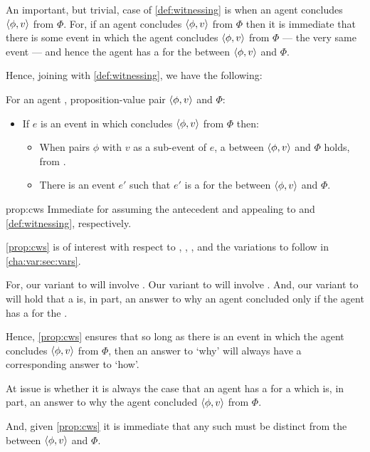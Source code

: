 \begin{note}
  An important, but trivial, case of \autoref{def:witnessing} is when an agent concludes \(\langle \phi, v \rangle\) from \(\Phi\).
  For, if an agent concludes \(\langle \phi, v \rangle\) from \(\Phi\) then it is immediate that there is some event in which the agent concludes \(\langle \phi, v \rangle\) from \(\Phi\) --- the very same event --- and hence the agent has a \wit{} for the \ros{} between \(\langle \phi, v \rangle\) and \(\Phi\).

  Hence, joining \supportI{} with \autoref{def:witnessing}, we have the following:

  \begin{proposition}
    \label{prop:cws}
    For an agent \vAgent{}, proposition-value pair \(\langle \phi, v \rangle\) and \pool{} \(\Phi\):
    \begin{itemize}
    \item
      If \(e\) is an event in which \vAgent{} concludes \(\langle \phi, v \rangle\) from \(\Phi\) then:
      \begin{itemize}
      \item
        When \vAgent{} pairs \(\phi\) with \(v\) as a sub-event of \(e\), a \ros{} between \(\langle \phi, v \rangle\) and \(\Phi\) holds, from .
      \item
        There is an event \(e'\) such that \(e'\) is a \wit{} for the \ros{} between \(\langle \phi, v \rangle\) and \(\Phi\).
      \end{itemize}
    \end{itemize}
    \vspace{-\baselineskip}
  \end{proposition}

  \begin{argument}{prop:cws}
    Immediate for assuming the antecedent and appealing to \supportI{} and \autoref{def:witnessing}, respectively.
  \end{argument}

  \autoref{prop:cws} is of interest with respect to \qWhy{}, \qHow{}, \issueInclusion{}, and the variations to follow in \autoref{cha:var:sec:vars}.

  For, our variant to \qWhy{} will involve .
  Our variant to \qHow{} will involve .
  And, our variant to \issueInclusion{} will hold that a \ros{} is, in part, an answer to why an agent concluded only if the agent has a \wit{} for the \ros{}.

  Hence, \autoref{prop:cws} ensures that so long as there is an event in which the agent concludes \(\langle \phi, v \rangle\) from \(\Phi\), then an answer to `why' will always have a corresponding answer to `how'.

  At issue is whether it is always the case that an agent has a \wit{} for a \ros{} which is, in part, an answer to why the agent concluded \(\langle \phi, v \rangle\) from \(\Phi\).

  And, given \autoref{prop:cws} it is immediate that any such \ros{} must be distinct from the \ros{} between \(\langle \phi, v \rangle\) and \(\Phi\).
\end{note}

